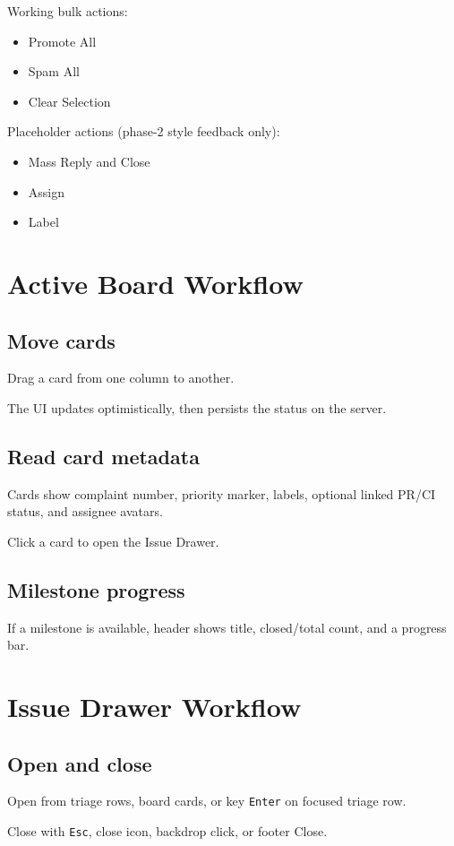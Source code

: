 \documentclass[11pt,a4paper]{article}
\begin{document}
Working bulk actions:
\begin{itemize}
  \item Promote All
  \item Spam All
  \item Clear Selection
\end{itemize}

Placeholder actions (phase-2 style feedback only):
\begin{itemize}
  \item Mass Reply and Close
  \item Assign
  \item Label
\end{itemize}

\section{Active Board Workflow}
\subsection{Move cards}
Drag a card from one column to another.

The UI updates optimistically, then persists the status on the server.

\subsection{Read card metadata}
Cards show complaint number, priority marker, labels, optional linked PR/CI status, and assignee avatars.

Click a card to open the Issue Drawer.

\subsection{Milestone progress}
If a milestone is available, header shows title, closed/total count, and a progress bar.

\section{Issue Drawer Workflow}
\subsection{Open and close}
Open from triage rows, board cards, or key \texttt{Enter} on focused triage row.

Close with \texttt{Esc}, close icon, backdrop click, or footer Close.
\end{document}
